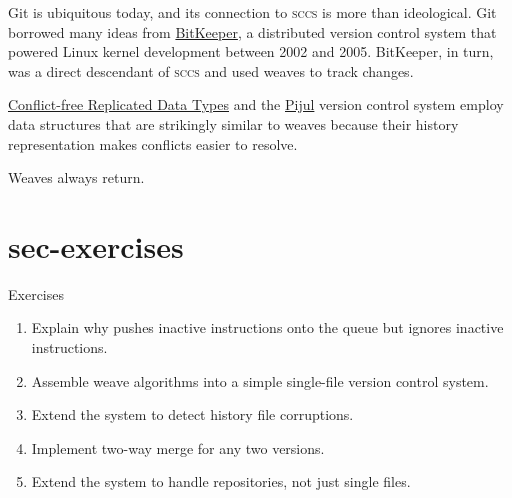 \documentclass{article}
\begin{document}
Git is ubiquitous today,
and its connection to \textsc{sccs} is more than ideological.
Git borrowed many ideas from \href{https://www.bitkeeper.org/}{BitKeeper},
a distributed version control system that powered Linux kernel development between 2002 and 2005.
BitKeeper, in turn, was a direct descendant of \textsc{sccs} and used weaves to track changes.

\href{https://en.wikipedia.org/wiki/Conflict-free_replicated_data_type}{Conflict-free Replicated Data Types}
and the \href{https://pijul.org/}{Pijul} version control system employ data structures
that are strikingly similar to weaves
because their history representation makes conflicts easier to resolve.

Weaves always return.

\section{sec-exercises}{Exercises}

\begin{enumerate}
\item Explain why  pushes inactive  instructions onto the queue but ignores inactive  instructions.
\item Assemble weave algorithms into a simple single-file version control system.
\item Extend the system to detect history file corruptions.
\item Implement two-way merge for any two versions.
\item Extend the system to handle repositories, not just single files.
\end{enumerate}
\end{document}
